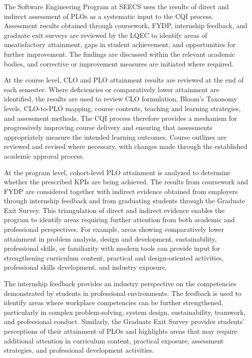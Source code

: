 The Software Engineering Program at SEECS uses the results of direct and indirect assessment of PLOs as a systematic input to the CQI process. Assessment results obtained through coursework, FYDP, internship feedback, and graduate exit surveys are reviewed by the LQEC to identify areas of unsatisfactory attainment, gaps in student achievement, and opportunities for further improvement. The findings are discussed within the relevant academic bodies, and corrective or improvement measures are initiated where required.

At the course level, CLO and PLO attainment results are reviewed at the end of each semester. Where deficiencies or comparatively lower attainment are identified, the results are used to review CLO formulation, Bloom's Taxonomy levels, CLO-to-PLO mapping, course contents, teaching and learning strategies, and assessment methods. The CQI process therefore provides a mechanism for progressively improving course delivery and ensuring that assessments appropriately measure the intended learning outcomes. Course outlines are reviewed and revised where necessary, with changes made through the established academic approval process.

At the program level, cohort-level PLO attainment is analyzed to determine whether the prescribed KPIs are being achieved. The results from coursework and FYDP are considered together with indirect evidence obtained from employers through internship feedback and from graduating students through the Graduate Exit Survey. This triangulation of direct and indirect evidence enables the program to identify areas requiring further attention from both academic and professional perspectives. For example, areas showing comparatively lower attainment in problem analysis, design and development, sustainability, professional skills, or familiarity with modern tools can provide input for strengthening curriculum content, practical and design-oriented activities, professional skills development, and industry exposure.

The internship feedback provides an industry perspective on the competencies demonstrated by students in professional environments. The feedback is used to identify areas where workplace competencies can be further strengthened, particularly in complex problem-solving, system design, sustainability, teamwork, and professional conduct. Similarly, the Graduate Exit Survey provides students' perceptions of their attainment of PLOs and highlights areas that may require additional attention in curriculum content, practical exposure, assessment strategies, and professional development activities.

